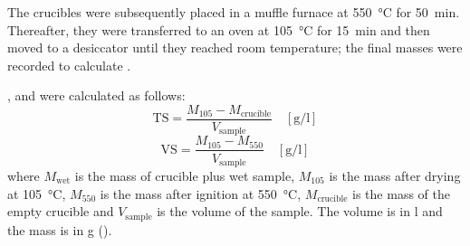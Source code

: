 \documentclass[12pt, a4paper, oneside]{report}
\begin{document}
The crucibles were subsequently placed in a muffle furnace at \qty{550}{\celsius} for \qty{50}{\minute}. Thereafter, they were transferred to an oven at \qty{105}{\celsius} for \qty{15}{\minute} and then moved to a desiccator until they reached room temperature; the final masses were recorded to calculate .

, and  were calculated as follows:
\begin{equation}
    \mathrm{TS} = \frac{M_{105} - M_{\text{crucible}}}{V_{\text{sample}}} \quad \left[\unit{\gram\per\litre}\right]
    \label{eq:TS}
\end{equation}
\begin{equation}
    \mathrm{VS} = \frac{M_{105} - M_{550}}{V_{\text{sample}}} \quad \left[\unit{\gram\per\litre}\right]
    \label{eq:VS}
\end{equation}
where $M_{\text{wet}}$ is the mass of crucible plus wet sample, $M_{105}$ is the mass after drying at \qty{105}{\celsius}, $M_{550}$ is the mass after ignition at \qty{550}{\celsius}, $M_{\text{crucible}}$ is the mass of the empty crucible and $V_{\text{sample}}$ is the volume of the sample. The volume is in \unit{\litre} and the mass is in \unit{\gram} ().
\end{document}
